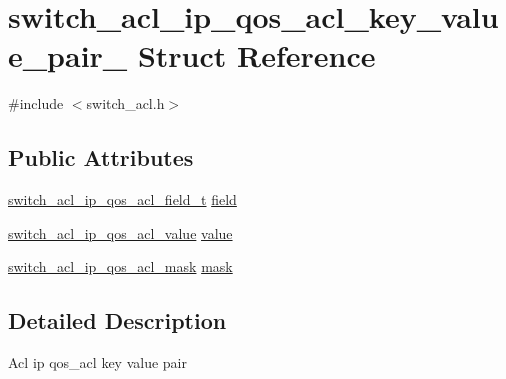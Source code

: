 \hypertarget{structswitch__acl__ip__qos__acl__key__value__pair__}{\section{switch\+\_\+acl\+\_\+ip\+\_\+qos\+\_\+acl\+\_\+key\+\_\+value\+\_\+pair\+\_\+ Struct Reference}
\label{structswitch__acl__ip__qos__acl__key__value__pair__}
}


{\ttfamily \#include $<$switch\+\_\+acl.\+h$>$}

\subsection*{Public Attributes}
\begin{DoxyCompactItemize}
\item 
\hyperlink{group__ACL_gabf0b1b6cea0a8c9c68a6aa5dd967fabd}{switch\+\_\+acl\+\_\+ip\+\_\+qos\+\_\+acl\+\_\+field\+\_\+t} \hyperlink{structswitch__acl__ip__qos__acl__key__value__pair___a7d463bb49f25798a68d11ae44711c605}{field}
\item 
\hyperlink{group__ACL_gaf51ed29b57c3cbe23ec21680d51f9791}{switch\+\_\+acl\+\_\+ip\+\_\+qos\+\_\+acl\+\_\+value} \hyperlink{structswitch__acl__ip__qos__acl__key__value__pair___a435da7c1a56035888b54a0547165e643}{value}
\item 
\hyperlink{group__ACL_ga06165cb67e82b9135066ccc4535bffbe}{switch\+\_\+acl\+\_\+ip\+\_\+qos\+\_\+acl\+\_\+mask} \hyperlink{structswitch__acl__ip__qos__acl__key__value__pair___a1326bbbcd4302d840488872217182588}{mask}
\end{DoxyCompactItemize}


\subsection{Detailed Description}
Acl ip qos\+\_\+acl key value pair 

